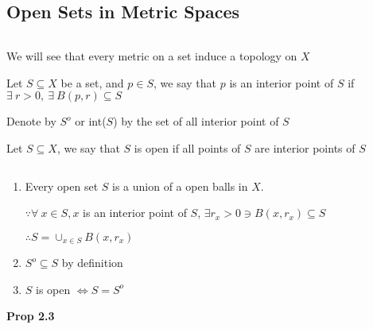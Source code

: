 \subsection{Open Sets in Metric Spaces} $ $

We will see that every metric on a set induce a topology on $X$

\begin{defn}
	Let $S \subseteq X$ be a set, and $p \in S$, we say that $p$ is an interior point of $S$ if $\exists~ r > 0,~\exists~B(p,r) \subseteq S$
	
	Denote by $S^o$ or int($S$) by the set of all interior point of $S$
\end{defn}

\begin{defn}[open]
	Let $S \subseteq X$, we say that $S$ is open if all points of $S$ are interior points of $S$
\end{defn}

\newpage

\begin{rmk*}$ $
	\begin{enumerate}[wide]
		\item Every open set $S$ is a union of a open balls in $X$.
		
		$\because \forall~x \in S,x$ is an interior point of $S$, $\exists r_x > 0 \ni B(x,r_x) \subseteq S$
		
		$\therefore S = \cup_{x \in S}B(x,r_x)$
		
		\item $S^o \subseteq S$ by definition
		\item $S$ is open $\Leftrightarrow S = S^o$
	\end{enumerate}
\end{rmk*}

\textbf{Prop 2.3}

